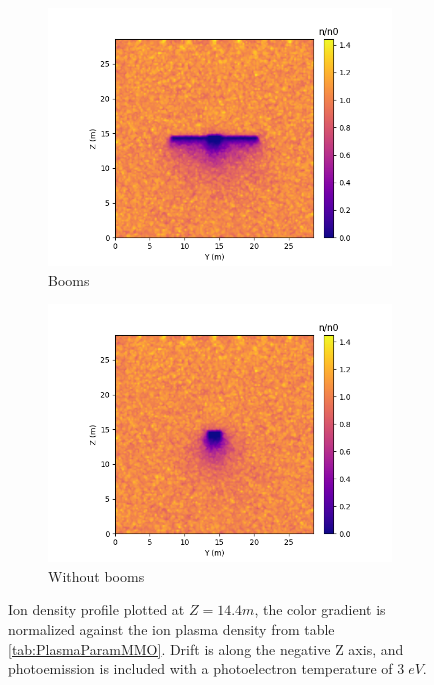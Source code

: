 \begin{figure}[H]
  \begin{subfigure}[b]{0.6\textwidth}
  \includegraphics[width=\textwidth]{figures/MMO/PHTemp/WB/I_PHTemp_WB.png}
  \caption{Booms}
  \label{fig:I_PHTemp_WB}
\end{subfigure}
\begin{subfigure}[b]{0.6\textwidth}
  \includegraphics[width=\textwidth]{figures/MMO/PHTemp/NB/I_PHTemp_NB.png}
  \caption{Without booms}
  \label{fig:I_PHTemp_NB}
\end{subfigure}
\label{fig:Ions_PHTemp}
\caption{Ion density profile plotted at $Z = 14.4 m$, the color gradient is normalized against the ion plasma density from table \ref{tab:PlasmaParamMMO}. Drift is along the negative Z axis, and photoemission is included with a photoelectron temperature of $3 \; eV$.}
\end{figure}

